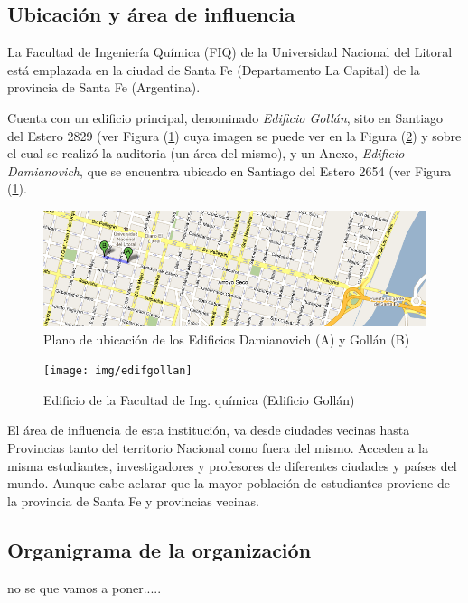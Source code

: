 \documentclass[10pt,a4paper,final]{article}
\begin{document}
\subsection{Ubicación y área de influencia}
La Facultad de Ingeniería Química (FIQ) de la Universidad Nacional del Litoral está emplazada en la ciudad de Santa Fe (Departamento La Capital) de la provincia de Santa Fe (Argentina). 

Cuenta con un edificio principal, denominado \emph{Edificio Gollán}, sito en Santiago del Estero 2829 (ver Figura (\ref{plano_edifs}) cuya imagen se puede ver en la Figura (\ref{edif_gollan}) y sobre el cual se realizó la auditoria (un área del mismo), y un Anexo, \emph{Edificio Damianovich}, que se encuentra ubicado en Santiago del Estero 2654 (ver Figura (\ref{plano_edifs}).

\begin{figure}[tbhp]
\centerline{\includegraphics[scale=0.5]{img/plano_edifs}}
\caption{Plano de ubicación de los Edificios Damianovich (A) y Gollán (B)}
\label{plano_edifs}
\end{figure}

\begin{figure}[tbhp]
\centerline{\texttt{[image: img/edifgollan]}}
\caption{Edificio de la Facultad de Ing. química (Edificio Gollán)}
\label{edif_gollan}
\end{figure}

El área de influencia de esta institución, va desde ciudades vecinas hasta Provincias tanto del territorio Nacional como fuera del mismo. Acceden a la misma estudiantes, investigadores y profesores de diferentes ciudades y países del mundo. Aunque cabe aclarar que la mayor población de estudiantes proviene de la provincia de Santa Fe y provincias vecinas.

\subsection{Organigrama de la organización}
no se que vamos a poner.....
\end{document}
